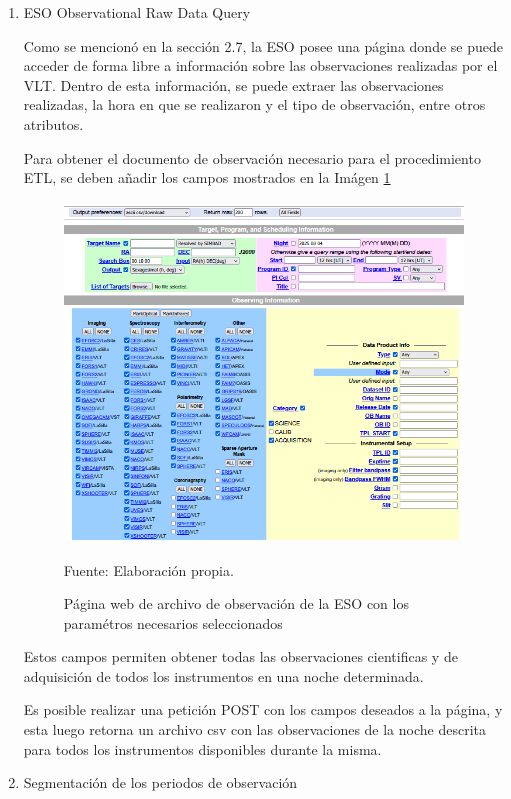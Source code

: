 \begin{enumerate}

    \item{ESO Observational Raw Data Query}
    
    Como se mencionó en la sección 2.7, la ESO posee una página donde se puede acceder de forma libre a información sobre las observaciones realizadas por el VLT. Dentro de esta información, se puede extraer las observaciones realizadas, la hora en que se realizaron y el tipo de observación, entre otros atributos.
    
    Para obtener el documento de observación necesario para el procedimiento ETL, se deben añadir los campos mostrados en la Imágen \ref{fig:eso_raw}

    \begin{figure}[h]
    \centering
    \includegraphics[width=13.5cm,height=9cm]{figures/eso_raw.png}
    \caption{\label{fig:eso_raw} Página web de archivo de observación de la ESO con los paramétros necesarios seleccionados} Fuente: Elaboración propia.
    \end{figure}
    
    Estos campos permiten obtener todas las observaciones cientificas y de adquisición de todos los instrumentos en una noche determinada.
    
    Es posible realizar una petición POST con los campos deseados a la página, y esta luego retorna un archivo csv con las observaciones de la noche descrita para todos los instrumentos disponibles durante la misma.

    \item{Segmentación de los periodos de observación}


\end{enumerate}

